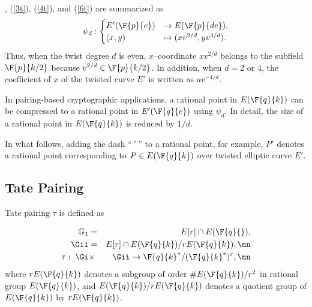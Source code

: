 
, (\ref{3t}), (\ref{4t}), and (\ref{6t}) are summarized as
\begin{eqnarray}
\psi_d : 
\begin{cases}
E'(\F{p}{e}) & \rightarrow  E(\F{p}{de}), \\
(x,y) & \mapsto (xv^{2/d},yv^{3/d}).
\end{cases} \label{gt}
\end{eqnarray}
Thus, when the twist degree $d$ is even, $x$--coordinate $xv^{2/d}$ belongs to the subfield $\F{p}{k/2}$ because $v^{2/d}\in \F{p}{k/2}$. In addition, when $d=2$ or $4$, the coefficient of $x$ of the twisted curve $E'$ is written as $av^{-4/d}$.

In pairing-based cryptographic applications, a rational point in $E(\F{q}{k})$ can be compressed to a rational point in $E'(\F{q}{e})$ using $\psi_d$.
In detail, the size of a rational point in $E(\F{q}{k})$ is reduced by $1/d$.

In what follows, adding the dash ``$\ '\ $'' to a rational point, for example, $P'$ denotes a rational point corresponding to $P \in E(\F{q}{k})$ over twisted elliptic curve $E'$.

\subsection{Tate Pairing}
Tate pairing $\tau$ is defined as 

\begin{eqnarray}
\mathbb{G}_1 &=& E[r]\cap E(\F{q}{}), \nonumber \\
\Gii &=& E[r]\cap E(\F{q}{k})/rE(\F{q}{k}), \nn \\
\tau:\;\Gi &\times& \Gii \rightarrow \F{q}{k}^*/(\F{q}{k}^*)^r, \nn
\end{eqnarray}
where $rE(\F{q}{k})$ denotes a subgroup of order $\#E(\F{q}{k})/r^2$ in rational group $E(\F{q}{k})$, and $E(\F{q}{k})/rE(\F{q}{k})$ denotes a quotient group of $E(\F{q}{k})$ by $rE(\F{q}{k})$.


